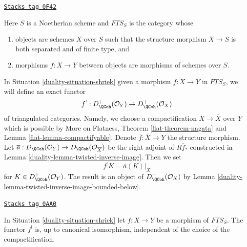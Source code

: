 \begin{definition}
\label{duality-situation-shriek}
\href{https://stacks.math.columbia.edu/tag/0F42}{\texttt{Stacks tag 0F42}}

Here $S$ is a Noetherian scheme and $\textit{FTS}_S$ is the category whose
\begin{enumerate}
\item objects are schemes $X$ over $S$ such that the structure
morphism $X \to S$ is both separated and of finite type, and
\item morphisms $f : X \to Y$ between objects are morphisms
of schemes over $S$.
\end{enumerate}
\end{definition}

In Situation \ref{duality-situation-shriek} given a morphism $f : X \to Y$
in $\textit{FTS}_S$, we will define an exact functor
$$
f^! : D_\QCoh^+(\mathcal{O}_Y) \to D_\QCoh^+(\mathcal{O}_X)
$$
of triangulated categories. Namely, we choose a compactification
$X \to \overline{X}$ over $Y$ which is possible by
More on Flatness, Theorem \ref{flat-theorem-nagata} and
Lemma \ref{flat-lemma-compactifyable}.
Denote $\overline{f} : \overline{X} \to Y$
the structure morphism. Let
$\overline{a} : D_\QCoh(\mathcal{O}_Y) \to D_\QCoh(\mathcal{O}_{\overline{X}})$
be the right adjoint of $R\overline{f}_*$
constructed in Lemma \ref{duality-lemma-twisted-inverse-image}. Then we set
$$
f^!K  = \overline{a}(K)|_X
$$
for $K \in D_\QCoh^+(\mathcal{O}_Y)$. The result is an object of
$D_\QCoh^+(\mathcal{O}_X)$ by
Lemma \ref{duality-lemma-twisted-inverse-image-bounded-below}.

\begin{lemma}
\label{duality-lemma-shriek-well-defined}
\href{https://stacks.math.columbia.edu/tag/0AA0}{\texttt{Stacks tag 0AA0}}

In Situation \ref{duality-situation-shriek} let $f : X \to Y$ be a morphism
of $\textit{FTS}_S$. The functor $f^!$ is, up to canonical isomorphism,
independent of the choice of the compactification.
\end{lemma}


